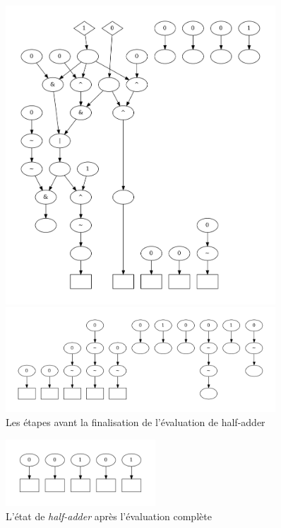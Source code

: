 \documentclass[a4paper,12pt]{article}
\begin{document}
\begin{figure}[H]
    \centering
    \begin{minipage}{0.49\textwidth}
        \includegraphics[width=0.9\textwidth]{figures/half_adder/debug_evualte_35-1.png}
    \end{minipage}
    \begin{minipage}{0.49\textwidth}
        \includegraphics[width=0.9\textwidth]{figures/half_adder/debug_evualte_51-1.png}
    \end{minipage}
    \caption{Les étapes avant la finalisation de l'évaluation de half-adder}
    \label{fig:etapes-avant-la-finalisation-de-l-evaluation-de-half-adder}
\end{figure}

\begin{figure}[H]
    \centering
    \includegraphics[width=0.5\textwidth]{figures/half_adder/debug_evualte_62-1.png}
    \caption{L'état de \textit{half-adder} après l'évaluation complète}
    \label{fig:etat-de-half-adder-apres-l-evaluation-complete}
\end{figure}
\end{document}
